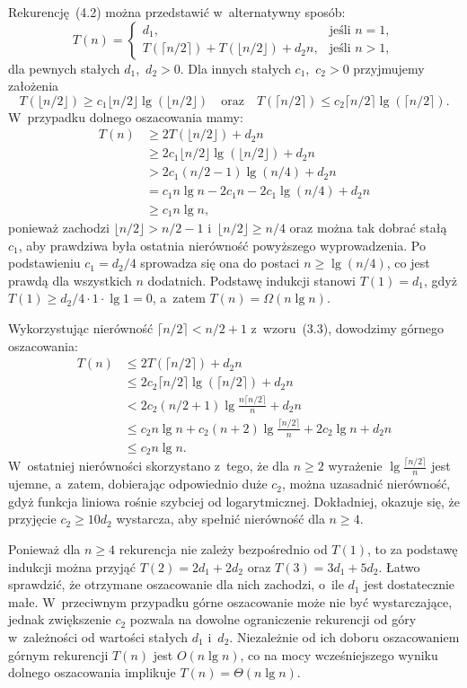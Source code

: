 \exercise %
Rekurencję~(4.2) można przedstawić w~alternatywny sposób:
\[
	T(n) =
	\begin{cases}
		d_1, & \text{jeśli $n=1$}, \\
		T(\lceil n/2\rceil)+T(\lfloor n/2\rfloor)+d_2n, & \text{jeśli $n>1$},
	\end{cases}
\]
dla pewnych stałych $d_1$,~$d_2>0$. Dla innych stałych $c_1$,~$c_2>0$ przyjmujemy założenia
\[
	T(\lfloor n/2\rfloor) \ge c_1\lfloor n/2\rfloor\lg(\lfloor n/2\rfloor) \quad\text{oraz}\quad T(\lceil n/2\rceil) \le c_2\lceil n/2\rceil\lg(\lceil n/2\rceil).
\]
W~przypadku dolnego oszacowania mamy:
\begin{align*}
	T(n) &\ge 2T(\lfloor n/2\rfloor)+d_2n \\
	&\ge 2c_1\lfloor n/2\rfloor\lg(\lfloor n/2\rfloor)+d_2n \\
	&> 2c_1(n/2-1)\lg(n/4)+d_2n \\
	&= c_1n\lg n-2c_1n-2c_1\!\lg(n/4)+d_2n \\
	&\ge c_1n\lg n,
\end{align*}
ponieważ zachodzi $\lfloor n/2\rfloor>n/2-1$ i~$\lfloor n/2\rfloor\ge n/4$ oraz można tak dobrać stałą $c_1$, aby prawdziwa była ostatnia nierówność powyższego wyprowadzenia. Po podstawieniu $c_1=d_2/4$ sprowadza się ona do postaci $n\ge\lg(n/4)$, co jest prawdą dla wszystkich $n$ dodatnich. Podstawę indukcji stanowi $T(1)=d_1$, gdyż $T(1)\ge d_2/4\cdot 1\cdot\lg1=0$, a~zatem $T(n)=\Omega(n\lg n)$.

Wykorzystując nierówność $\lceil n/2\rceil<n/2+1$ z~wzoru~(3.3), dowodzimy górnego oszacowania:
\begin{align*}
	T(n) &\le 2T(\lceil n/2\rceil)+d_2n \\
	&\le 2c_2\lceil n/2\rceil\lg(\lceil n/2\rceil)+d_2n \\
	&< 2c_2(n/2+1)\lg\frac{n\lceil n/2\rceil}{n}+d_2n \\
	&\le c_2n\lg n+c_2(n+2)\lg\frac{\lceil n/2\rceil}{n}+2c_2\lg n+d_2n \\
	&\le c_2n\lg n.
\end{align*}
W~ostatniej nierówności skorzystano z~tego, że dla $n\ge2$ wyrażenie $\lg\frac{\lceil n/2\rceil}{n}$ jest ujemne, a~zatem, dobierając odpowiednio duże $c_2$, można uzasadnić nierówność, gdyż funkcja liniowa rośnie szybciej od logarytmicznej. Dokładniej, okazuje się, że przyjęcie $c_2\ge10d_2$ wystarcza, aby spełnić nierówność dla $n\ge4$.

Ponieważ dla $n\ge4$ rekurencja nie zależy bezpośrednio od $T(1)$, to za podstawę indukcji można przyjąć $T(2)=2d_1+2d_2$ oraz $T(3)=3d_1+5d_2$. Łatwo sprawdzić, że otrzymane oszacowanie dla nich zachodzi, o~ile $d_1$ jest dostatecznie małe. W~przeciwnym przypadku górne oszacowanie może nie być wystarczające, jednak zwiększenie $c_2$ pozwala na dowolne ograniczenie rekurencji od góry w~zależności od wartości stałych $d_1$ i~$d_2$. Niezależnie od ich doboru oszacowaniem górnym rekurencji $T(n)$ jest $O(n\lg n)$, co na mocy wcześniejszego wyniku dolnego oszacowania implikuje $T(n)=\Theta(n\lg n)$.

